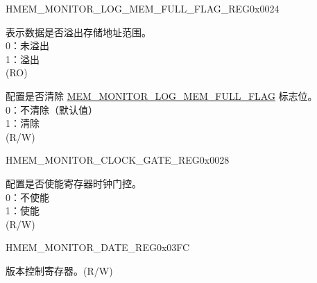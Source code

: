 \begin{register}{H}{MEM\_MONITOR\_LOG\_MEM\_FULL\_FLAG\_REG}{0x0024}\label{regdesc:MEMMONITORLOGMEMFULLFLAGREG}
%
%
%
\regnewline%
\begin{regdesc}\begin{reglist}
\label{fielddesc:MEMMONITORLOGMEMFULLFLAG}\item [MEM\_MONITOR\_LOG\_MEM\_FULL\_FLAG] 表示数据是否溢出存储地址范围。\\
0：未溢出\\
1：溢出\\
(RO)
\label{fielddesc:MEMMONITORCLRLOGMEMFULLFLAG}\item [MEM\_MONITOR\_CLR\_LOG\_MEM\_FULL\_FLAG] 配置是否清除 \hyperref[fielddesc:MEMMONITORLOGMEMFULLFLAG]{MEM\_MONITOR\_LOG\_MEM\_FULL\_FLAG} 标志位。\\
0：不清除（默认值）\\
1：清除\\
(R/W)
\end{reglist}\end{regdesc}
\end{register}

\begin{register}{H}{MEM\_MONITOR\_CLOCK\_GATE\_REG}{0x0028}\label{regdesc:MEMMONITORCLOCKGATEREG}
%
%
\regnewline%
\begin{regdesc}\begin{reglist}
\label{fielddesc:MEMMONITORCLKEN}\item [MEM\_MONITOR\_CLK\_EN] 配置是否使能寄存器时钟门控。\\
0：不使能\\
1：使能\\
(R/W)
\end{reglist}\end{regdesc}
\end{register}

\begin{register}{H}{MEM\_MONITOR\_DATE\_REG}{0x03FC}\label{regdesc:MEMMONITORDATEREG}
%
%
\regnewline%
\begin{regdesc}\begin{reglist}
\label{fielddesc:MEMMONITORDATE}\item [MEM\_MONITOR\_DATE] 版本控制寄存器。(R/W)
\end{reglist}\end{regdesc}
\end{register}

